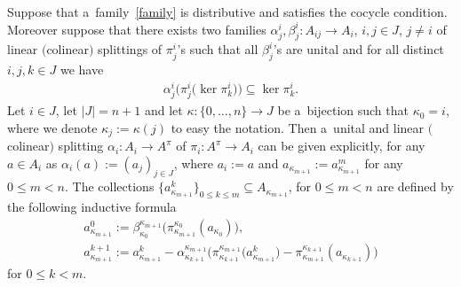 \documentclass[pdftex]{sigma}
\begin{document}
\begin{theorem}
\label{main-split}
Suppose that a~family~\eqref{family} is distributive and satisfies the cocycle condition.
Moreover suppose that there exists two families $\alpha^i_j,\beta^i_j:A_{ij}\rightarrow A_i$, $i,j\in J$,
$j\neq i$ of linear $($colinear$)$ splittings of $\pi^i_j$'s such that all $\beta^i_j$'s are unital and for all distinct
$i,j,k\in J$ we have
\begin{gather}
\label{thkercond}
\alpha^i_j\big(\pi^i_j\big(\ker\pi^i_k\big)\big)\subseteq\ker\pi^i_k.
\end{gather}
Let $i\in J$, let $|J|=n+1$ and let $\kappa:\{0,\ldots,n\}\rightarrow J$ be a~bijection such that $\kappa_0=i$, where we
denote $\kappa_j:=\kappa(j)$ to easy the notation.
Then a~unital and linear $($colinear$)$ splitting $\alpha_i:A_i\rightarrow A^\pi$ of $\pi_i:A^\pi\rightarrow A_i$ can be
given explicitly, for any $a\in A_i$ as $\alpha_i(a):=(a_j)_{j\in J}$, where $a_i:=a$ and
$a_{\kappa_{m+1}}:=a^m_{\kappa_{m+1}}$ for any $0\leq m<n$.
The collections $\{a^k_{\kappa_{m+1}}\}_{0\leq k\leq m}\subseteq A_{\kappa_{m+1}}$, for $0\leq m<n$ are defined by the
following inductive formula
\begin{gather}
a^0_{\kappa_{m+1}}:=\beta^{\kappa_{m+1}}_{\kappa_0}\big(\pi^{\kappa_0}_{\kappa_{m+1}}(a_{\kappa_0})\big),
\nonumber
\\
a^{k+1}_{\kappa_{m+1}}:=a_{\kappa_{m+1}}^k-\alpha^{\kappa_{m+1}}_{\kappa_{k+1}}
\big(\pi^{\kappa_{m+1}}_{\kappa_{k+1}}\big(a^k_{\kappa_{m+1}}\big)-\pi^{\kappa_{k+1}}_{\kappa_{m+1}}(a_{\kappa_{k+1}})\big)
\label{recsplitform}
\end{gather}
for $0\leq k<m$.
\end{theorem}
\end{document}
